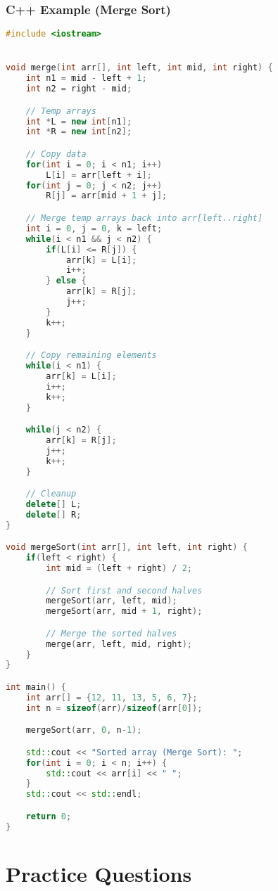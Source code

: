 \documentclass[a4paper,12pt]{article}
\begin{document}
\subsubsection*{C++ Example (Merge Sort)}
\begin{lstlisting}[language=C++]
#include <iostream>


void merge(int arr[], int left, int mid, int right) {
    int n1 = mid - left + 1;
    int n2 = right - mid;

    // Temp arrays
    int *L = new int[n1];
    int *R = new int[n2];

    // Copy data
    for(int i = 0; i < n1; i++)
        L[i] = arr[left + i];
    for(int j = 0; j < n2; j++)
        R[j] = arr[mid + 1 + j];

    // Merge temp arrays back into arr[left..right]
    int i = 0, j = 0, k = left;
    while(i < n1 && j < n2) {
        if(L[i] <= R[j]) {
            arr[k] = L[i];
            i++;
        } else {
            arr[k] = R[j];
            j++;
        }
        k++;
    }

    // Copy remaining elements
    while(i < n1) {
        arr[k] = L[i];
        i++;
        k++;
    }

    while(j < n2) {
        arr[k] = R[j];
        j++;
        k++;
    }

    // Cleanup
    delete[] L;
    delete[] R;
}

void mergeSort(int arr[], int left, int right) {
    if(left < right) {
        int mid = (left + right) / 2;

        // Sort first and second halves
        mergeSort(arr, left, mid);
        mergeSort(arr, mid + 1, right);

        // Merge the sorted halves
        merge(arr, left, mid, right);
    }
}

int main() {
    int arr[] = {12, 11, 13, 5, 6, 7};
    int n = sizeof(arr)/sizeof(arr[0]);

    mergeSort(arr, 0, n-1);

    std::cout << "Sorted array (Merge Sort): ";
    for(int i = 0; i < n; i++) {
        std::cout << arr[i] << " ";
    }
    std::cout << std::endl;

    return 0;
}
\end{lstlisting}

\newpage
\section{Practice Questions}
\end{document}
